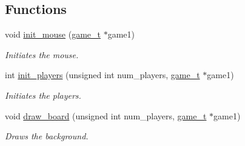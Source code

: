 \subsection*{Functions}
\begin{DoxyCompactItemize}
\item 
void \hyperlink{group___game_ga97a9584ff1d8b78ede18e32bf5a7bd50}{init\+\_\+mouse} (\hyperlink{structgame__t}{game\+\_\+t} $\ast$game1)
\begin{DoxyCompactList}\small\item\em Initiates the mouse. \end{DoxyCompactList}\item 
int \hyperlink{group___game_ga1ebb9b5b5ce215ca81c1ca22526d935a}{init\+\_\+players} (unsigned int num\+\_\+players, \hyperlink{structgame__t}{game\+\_\+t} $\ast$game1)
\begin{DoxyCompactList}\small\item\em Initiates the players. \end{DoxyCompactList}\item 
void \hyperlink{group___game_ga1904435b0a61ef11d90bec5376eb6398}{draw\+\_\+board} (unsigned int num\+\_\+players, \hyperlink{structgame__t}{game\+\_\+t} $\ast$game1)
\begin{DoxyCompactList}\small\item\em Draws the background. \end{DoxyCompactList}\end{DoxyCompactItemize}
